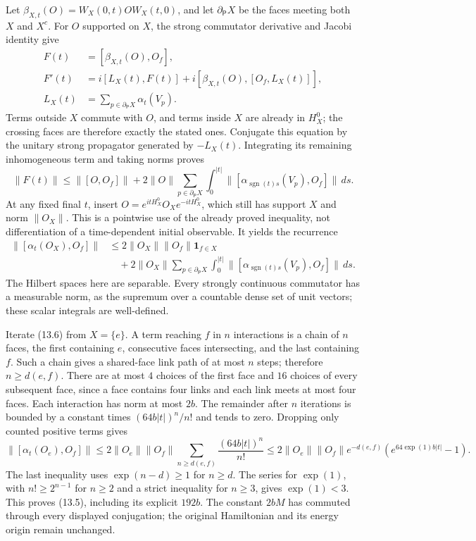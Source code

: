 \documentclass[
]{article}
\begin{document}
Let \(\beta_{X,t}(O)=W_X(0,t)OW_X(t,0)\), and let
\(\partial_{\mathsf P}X\) be the faces meeting both \(X\) and \(X^c\).
For \(O\) supported on \(X\), the strong commutator derivative and
Jacobi identity give \[
\begin{split}
F(t)&=[\beta_{X,t}(O),O_f],\\
F'(t)&=i[L_X(t),F(t)]
   +i[\beta_{X,t}(O),[O_f,L_X(t)]],\\
L_X(t)&=\sum_{p\in\partial_{\mathsf P}X}\alpha_t(V_p).
\end{split}
\] Terms outside \(X\) commute with \(O\), and terms inside \(X\) are
already in \(H_X^0\); the crossing faces are therefore exactly the
stated ones. Conjugate this equation by the unitary strong propagator
generated by \(-L_X(t)\). Integrating its remaining inhomogeneous term
and taking norms proves \[
\|F(t)\|\le\|[O,O_f]\|+
 2\|O\|\sum_{p\in\partial_{\mathsf P}X}
 \int_0^{|t|}\|[\alpha_{\operatorname{sgn}(t)s}(V_p),O_f]\|\,ds.
\] At any fixed final \(t\), insert \(O=e^{itH_X^0}O_Xe^{-itH_X^0}\),
which still has support \(X\) and norm \(\|O_X\|\). This is a pointwise
use of the already proved inequality, not differentiation of a
time-dependent initial observable. It yields the recurrence \[
\begin{split}
\|[\alpha_t(O_X),O_f]\|
&\le2\|O_X\|\|O_f\|\mathbf1_{f\in X}\\
&\quad+2\|O_X\|\sum_{p\in\partial_{\mathsf P}X}
 \int_0^{|t|}\|[\alpha_{\operatorname{sgn}(t)s}(V_p),O_f]\|\,ds .
\end{split}                                                   \tag{13.6}
\] The Hilbert spaces here are separable. Every strongly continuous
commutator has a measurable norm, as the supremum over a countable dense
set of unit vectors; these scalar integrals are well-defined.

Iterate (13.6) from \(X=\{e\}\). A term reaching \(f\) in \(n\)
interactions is a chain of \(n\) faces, the first containing \(e\),
consecutive faces intersecting, and the last containing \(f\). Such a
chain gives a shared-face link path of at most \(n\) steps; therefore
\(n\ge d(e,f)\). There are at most \(4\) choices of the first face and
\(16\) choices of every subsequent face, since a face contains four
links and each link meets at most four faces. Each interaction has norm
at most \(2b\). The remainder after \(n\) iterations is bounded by a
constant times \((64b|t|)^n/n!\) and tends to zero. Dropping only
counted positive terms gives \[
\|[\alpha_t(O_e),O_f]\|
\le2\|O_e\|\|O_f\|\sum_{n\ge d(e,f)}
 \frac{(64b|t|)^n}{n!}
\le2\|O_e\|\|O_f\|e^{-d(e,f)}
       (e^{64\exp(1)b|t|}-1).
\] The last inequality uses \(\exp(n-d)\ge1\) for \(n\ge d\). The series
for \(\exp(1)\), with \(n!\ge2^{n-1}\) for \(n\ge2\) and a strict
inequality for \(n\ge3\), gives \(\exp(1)<3\). This proves (13.5),
including its explicit \(192b\). The constant \(2bM\) has commuted
through every displayed conjugation; the original Hamiltonian and its
energy origin remain unchanged.
\end{document}
